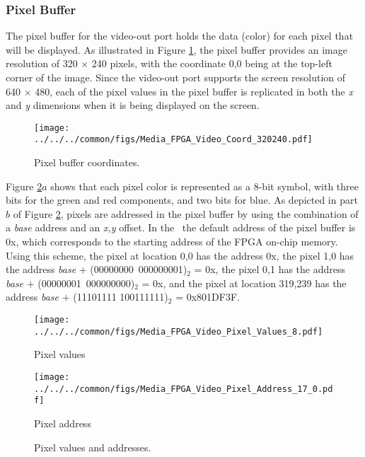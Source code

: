 \subsubsection{Pixel Buffer}
\label{sec:pixel_buffer}

The pixel buffer for the video-out port holds the data (color) for each pixel that
will be displayed.  As illustrated in Figure \ref{fig:video_coord}, the
pixel buffer provides an image resolution of 
320 $\times$ 240 pixels, with the coordinate 0,0 being at the top-left corner of the image. 
Since the video-out port supports the screen resolution of 640 $\times$ 480, each of the
pixel values in
the pixel buffer is replicated in both the {\it x} and {\it y} dimensions when it is being
displayed on the screen.

\begin{figure}[h!]
   \begin{center}
       \texttt{[image: ../../../common/figs/Media\_FPGA\_Video\_Coord\_320240.pdf]}
   \end{center}
   \caption{Pixel buffer coordinates.}
	\label{fig:video_coord}
\end{figure}

Figure \ref{fig:pixels}$a$ shows that each pixel color is represented as a 8-bit symbol, 
with three bits for the green and red 
components, and two bits for blue.  As depicted in part $b$ of Figure \ref{fig:pixels}, 
pixels are addressed in the pixel buffer by 
using the combination of a {\it base} address and an {\it x,y} offset.  In the \systemName~the default
address of the pixel buffer is {\sf 0x}, which corresponds
to the starting address of the FPGA on-chip memory.  Using this scheme, the pixel at 
location 0,0 has the address {\sf 0x}, 
the pixel 1,0 has the address {\it base} $+$ (00000000~000000001)$_2$ = {\sf 0x}, 
the pixel 0,1 has the address {\it base} $+$ (00000001~000000000)$_2$ = {\sf 0x},
and the pixel at location 319,239 has the address {\it base} $+$ (11101111 100111111)$_2$ = 
{\sf 0x\baseAddressOffset 801DF3F}. 

\begin{figure}[h!]
   \begin{center}
       \texttt{[image: ../../../common/figs/Media\_FPGA\_Video\_Pixel\_Values\_8.pdf]}
			 \caption*{Pixel values}
			 \vspace{1cm}
			 \texttt{[image: ../../../common/figs/Media\_FPGA\_Video\_Pixel\_Address\_17\_0.pdf]}
			 \caption*{Pixel address}
   \end{center}
   \caption{Pixel values and addresses.}
	\label{fig:pixels}
\end{figure}

